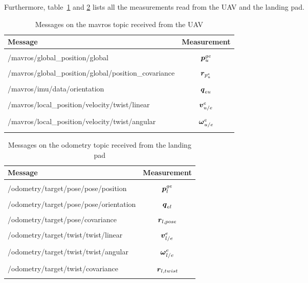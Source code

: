 Furthermore, table~\ref{tab:sensorMsgTopic} and \ref{tab:mavrosMsg} lists all the measurements read from the \gls{UAV} and the landing pad.
\begin{table}[ht]
\centering 
  \begin{tabular}{l c}
    \toprule
    \textbf{Message}&\textbf{Measurement} \\\hline \\[-1em]
    /mavros/global\_position/global&$\boldsymbol{p}^{ge}_{u}$\\ \\[-1em]
    /mavros/global\_position/global/position\_covariance&$\boldsymbol{r}_{p_u^e}$\\ \\[-1em]
    /mavros/imu/data/orientation&$\boldsymbol{q}_{eu}$\\ \\[-1em]
    /mavros/local\_position/velocity/twist/linear&$\boldsymbol{v}^e_{u/e}$\\ \\[-1em]
    /mavros/local\_position/velocity/twist/angular&$\boldsymbol{\omega}^e_{u/e}$\\ \\[-1em]
    \bottomrule
  \end{tabular}
  \caption{Messages on the mavros topic received from the UAV}
  \label{tab:sensorMsgTopic}
\end{table}
\begin{table}[ht]
\centering 
  \begin{tabular}{l c}
    \toprule
    \textbf{Message}&\textbf{Measurement} \\\hline \\[-1em]
    /odometry/target/pose/pose/position&$\boldsymbol{p}^{ge}_{l}$\\ \\[-1em]
    /odometry/target/pose/pose/orientation&$\boldsymbol{q}_{el}$\\ \\[-1em]
    /odometry/target/pose/covariance&$\boldsymbol{r}_{l,pose}$\\ \\[-1em]
    /odometry/target/twist/twist/linear&$\boldsymbol{v}^e_{l/e}$\\ \\[-1em]
    /odometry/target/twist/twist/angular&$\boldsymbol{\omega}^e_{l/e}$\\ \\[-1em]
    /odometry/target/twist/covariance&$\boldsymbol{r}_{l,twist}$\\ \\[-1em]
    \bottomrule
  \end{tabular}
  \caption{Messages on the odometry topic received from the landing pad}
  \label{tab:mavrosMsg}
\end{table}

